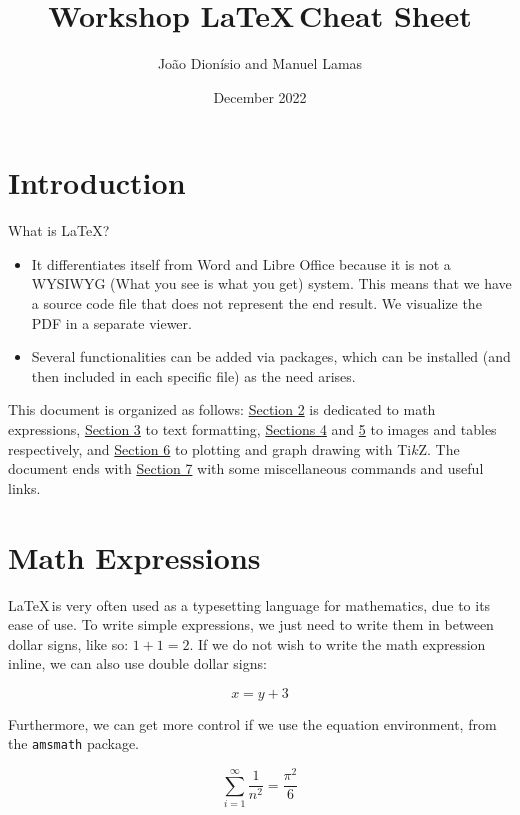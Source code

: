 \documentclass[10pt]{article}
\title{Workshop \LaTeX\,Cheat Sheet}
\author{João Dionísio and Manuel Lamas}
\date{December 2022}
\begin{document}
\maketitle

\section{Introduction}

What is \LaTeX?
\begin{itemize}
    \item It differentiates itself from Word and Libre Office because it is not a WYSIWYG (What you see is what you get) system. This means that we have a source code file that does not represent the end result. We visualize the PDF in a separate viewer.
    \item Several functionalities can be added via packages, which can be installed (and then included in each specific file) as the need arises.
\end{itemize}

This document is organized as follows: \hyperref[sec:math]{Section 2} is dedicated to math expressions, \hyperref[sec:text_format]{Section 3} to text formatting, \hyperref[sec:images]{Sections 4} and \hyperref[sec:tables]{5} to images and tables respectively, and \hyperref[sec:tikz]{Section 6} to plotting and graph drawing with Ti$k$Z.
The document ends with \hyperref[sec:misc]{Section 7} with some miscellaneous commands and useful links.

\section{Math Expressions}
\label{sec:math}

\LaTeX\,is very often used as a typesetting language for mathematics, due to its ease of use.
To write simple expressions, we just need to write them in between dollar signs, like so: $1+1=2$.
If we do not wish to write the math expression inline, we can also use double dollar signs:

$$x = y + 3$$

Furthermore, we can get more control if we use the equation environment, from the \verb|amsmath| package.

\begin{equation}
    \sum_{i=1}^{\infty}\dfrac{1}{n^{2}} = \dfrac{\pi^{2}}{6}
    \label{eq:basel_problem}
\end{equation}
\end{document}
